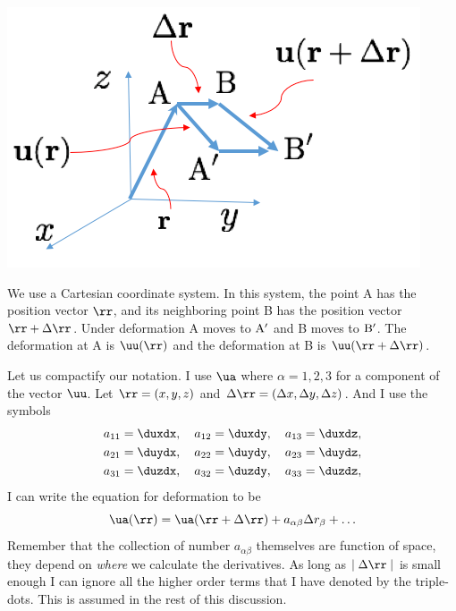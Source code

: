 %
 \begin{marginfigure}
  \includegraphics{figures/deform_sketch.png}
 \caption{We use a Cartesian coordinate system. In this system, the
   point A has the position vector $\rr$, and its neighboring point B
 has the position vector $\rr+\Delta \rr$. Under deformation A moves
 to ${\rm A}^{\prime}$ and B moves to ${\rm B}^{\prime}$. The
 deformation at A is $\uu(\rr)$ and the deformation at B is
 $\uu(\rr+\Delta \rr)$. }
  \label{fig:dsketch}
\end{marginfigure}
%
Let us compactify our notation. I use $\ua$ where $\alpha =1,2,3$ for
a component of the vector $\uu$. Let $\rr = (x,y,z)$ and $\Delta\rr =
(\Delta x, \Delta y, \Delta z)$. And I use the symbols 
\begin{subequations}
\begin{align}
a_{11} & =  \duxdx  \/, \quad a_{12} =  \duxdy \/,\quad  a_{13} =
         \duxdz \/, \\
a_{21} & =  \duydx  \/, \quad a_{22} =  \duydy \/,\quad  a_{23} =
         \duydz \/, \\
 a_{31} & =  \duzdx  \/, \quad a_{32} =  \duzdy \/,\quad  a_{33} =
         \duzdz \/,
\end{align} 
\end{subequations}
I can write the equation for deformation to be 
\begin{equation}
\ua(\rr) = \ua(\rr+\Delta \rr) + a_{\alpha\beta} \Delta r_{\beta} + \ldots
\end{equation}
Remember that the collection of number $a_{\alpha\beta}$ themselves
are function of space, they depend on \textit{where} we calculate the
derivatives.  As long as  $\mid\Delta \rr\mid$ is small enough I can
ignore all the higher order terms that I have denoted by the
triple-dots.  This is assumed in the rest of this discussion. 

